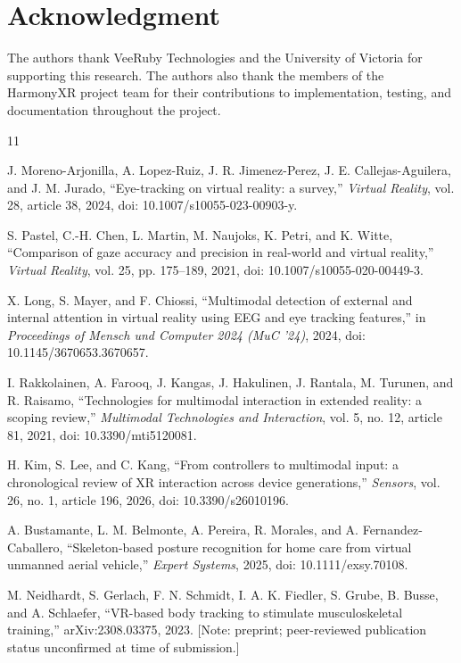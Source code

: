 \documentclass[conference]{IEEEtran}
\begin{document}
\section*{Acknowledgment}
The authors thank VeeRuby Technologies and the University of Victoria for supporting this research. The authors also thank the members of the HarmonyXR project team for their contributions to implementation, testing, and documentation throughout the project.

\begin{thebibliography}{11}

J. Moreno-Arjonilla, A. Lopez-Ruiz, J. R. Jimenez-Perez, J. E. Callejas-Aguilera, and J. M. Jurado, ``Eye-tracking on virtual reality: a survey,'' \emph{Virtual Reality}, vol. 28, article 38, 2024, doi: 10.1007/s10055-023-00903-y.

S. Pastel, C.-H. Chen, L. Martin, M. Naujoks, K. Petri, and K. Witte, ``Comparison of gaze accuracy and precision in real-world and virtual reality,'' \emph{Virtual Reality}, vol. 25, pp. 175--189, 2021, doi: 10.1007/s10055-020-00449-3.

X. Long, S. Mayer, and F. Chiossi, ``Multimodal detection of external and internal attention in virtual reality using EEG and eye tracking features,'' in \emph{Proceedings of Mensch und Computer 2024 (MuC '24)}, 2024, doi: 10.1145/3670653.3670657.

I. Rakkolainen, A. Farooq, J. Kangas, J. Hakulinen, J. Rantala, M. Turunen, and R. Raisamo, ``Technologies for multimodal interaction in extended reality: a scoping review,'' \emph{Multimodal Technologies and Interaction}, vol. 5, no. 12, article 81, 2021, doi: 10.3390/mti5120081.

H. Kim, S. Lee, and C. Kang, ``From controllers to multimodal input: a chronological review of XR interaction across device generations,'' \emph{Sensors}, vol. 26, no. 1, article 196, 2026, doi: 10.3390/s26010196.

A. Bustamante, L. M. Belmonte, A. Pereira, R. Morales, and A. Fernandez-Caballero, ``Skeleton-based posture recognition for home care from virtual unmanned aerial vehicle,'' \emph{Expert Systems}, 2025, doi: 10.1111/exsy.70108.

M. Neidhardt, S. Gerlach, F. N. Schmidt, I. A. K. Fiedler, S. Grube, B. Busse, and A. Schlaefer, ``VR-based body tracking to stimulate musculoskeletal training,'' arXiv:2308.03375, 2023.
[Note: preprint; peer-reviewed publication status unconfirmed at time of submission.]


\end{thebibliography}
\end{document}
